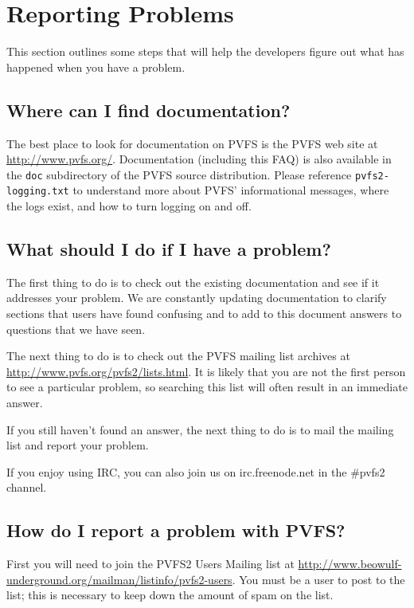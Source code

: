 \documentclass[11pt,letterpaper]{article}
\begin{document}
%
%
\section{Reporting Problems}

This section outlines some steps that will help the developers figure out what
has happened when you have a problem.

\subsection{Where can I find documentation?}

The best place to look for documentation on PVFS is the PVFS web site at
\url{http://www.pvfs.org/}.  Documentation (including this FAQ) is also
available in the \texttt{doc} subdirectory of the PVFS source distribution.
Please reference \texttt{pvfs2-logging.txt} to understand more about PVFS'
informational messages, where the logs exist, and how to turn logging
on and off.

\subsection{What should I do if I have a problem?}

The first thing to do is to check out the existing documentation and see if it
addresses your problem.  We are constantly updating documentation to clarify
sections that users have found confusing and to add to this document answers
to questions that we have seen.

The next thing to do is to check out the PVFS mailing list archives at
\url{http://www.pvfs.org/pvfs2/lists.html}.  It is likely that you are not
the first person to see a particular problem, so searching this list will
often result in an immediate answer.

If you still haven't found an answer, the next thing to do is to mail the
mailing list and report your problem.

If you enjoy using IRC, you can also join us on irc.freenode.net in
the \#pvfs2 channel.

\subsection{How do I report a problem with PVFS?}

First you will need to join the PVFS2 Users Mailing list at
\url{http://www.beowulf-underground.org/mailman/listinfo/pvfs2-users}.  You
must be a user to post to the list; this is necessary to keep down the amount
of spam on the list.
\end{document}
